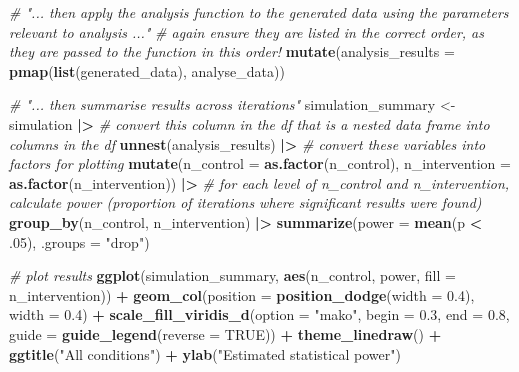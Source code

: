 \documentclass[
]{article}
\newenvironment{Shaded}{\begin{snugshade}}{\end{snugshade}}
\newcommand{\AttributeTok}[1]{\textcolor[rgb]{0.13,0.29,0.53}{#1}}
\newcommand{\CommentTok}[1]{\textcolor[rgb]{0.56,0.35,0.01}{\textit{#1}}}
\newcommand{\ConstantTok}[1]{\textcolor[rgb]{0.56,0.35,0.01}{#1}}
\newcommand{\DecValTok}[1]{\textcolor[rgb]{0.00,0.00,0.81}{#1}}
\newcommand{\FloatTok}[1]{\textcolor[rgb]{0.00,0.00,0.81}{#1}}
\newcommand{\FunctionTok}[1]{\textcolor[rgb]{0.13,0.29,0.53}{\textbf{#1}}}
\newcommand{\NormalTok}[1]{#1}
\newcommand{\OtherTok}[1]{\textcolor[rgb]{0.56,0.35,0.01}{#1}}
\newcommand{\SpecialCharTok}[1]{\textcolor[rgb]{0.81,0.36,0.00}{\textbf{#1}}}
\newcommand{\StringTok}[1]{\textcolor[rgb]{0.31,0.60,0.02}{#1}}
\begin{document}
\begin{Shaded}
\begin{Highlighting}[]
  \CommentTok{\# "... then apply the analysis function to the generated data using the parameters relevant to analysis ..."}
  \CommentTok{\# again ensure they are listed in the correct order, as they are passed to the function in this order!}
  \FunctionTok{mutate}\NormalTok{(}\AttributeTok{analysis\_results =} \FunctionTok{pmap}\NormalTok{(}\FunctionTok{list}\NormalTok{(generated\_data),}
\NormalTok{                                 analyse\_data))}
  

\CommentTok{\# "... then summarise results across iterations"}
\NormalTok{simulation\_summary }\OtherTok{\textless{}{-}}\NormalTok{ simulation }\SpecialCharTok{|\textgreater{}}
  \CommentTok{\# convert this column in the df that is a nested data frame into columns in the df}
  \FunctionTok{unnest}\NormalTok{(analysis\_results) }\SpecialCharTok{|\textgreater{}} 
  \CommentTok{\# convert these variables into factors for plotting}
  \FunctionTok{mutate}\NormalTok{(}\AttributeTok{n\_control =} \FunctionTok{as.factor}\NormalTok{(n\_control), }
         \AttributeTok{n\_intervention =} \FunctionTok{as.factor}\NormalTok{(n\_intervention)) }\SpecialCharTok{|\textgreater{}}
  \CommentTok{\# for each level of n\_control and n\_intervention, calculate power (proportion of iterations where significant results were found)}
  \FunctionTok{group\_by}\NormalTok{(n\_control, }
\NormalTok{           n\_intervention) }\SpecialCharTok{|\textgreater{}}
  \FunctionTok{summarize}\NormalTok{(}\AttributeTok{power =} \FunctionTok{mean}\NormalTok{(p }\SpecialCharTok{\textless{}}\NormalTok{ .}\DecValTok{05}\NormalTok{), }\AttributeTok{.groups =} \StringTok{"drop"}\NormalTok{)}

\CommentTok{\# plot results}
\FunctionTok{ggplot}\NormalTok{(simulation\_summary, }\FunctionTok{aes}\NormalTok{(n\_control, power, }\AttributeTok{fill =}\NormalTok{ n\_intervention)) }\SpecialCharTok{+}
  \FunctionTok{geom\_col}\NormalTok{(}\AttributeTok{position =} \FunctionTok{position\_dodge}\NormalTok{(}\AttributeTok{width =} \FloatTok{0.4}\NormalTok{), }\AttributeTok{width =} \FloatTok{0.4}\NormalTok{) }\SpecialCharTok{+}
  \FunctionTok{scale\_fill\_viridis\_d}\NormalTok{(}\AttributeTok{option =} \StringTok{"mako"}\NormalTok{, }\AttributeTok{begin =} \FloatTok{0.3}\NormalTok{, }\AttributeTok{end =} \FloatTok{0.8}\NormalTok{, }
                       \AttributeTok{guide =} \FunctionTok{guide\_legend}\NormalTok{(}\AttributeTok{reverse =} \ConstantTok{TRUE}\NormalTok{)) }\SpecialCharTok{+}
  \FunctionTok{theme\_linedraw}\NormalTok{() }\SpecialCharTok{+}
  \FunctionTok{ggtitle}\NormalTok{(}\StringTok{"All conditions"}\NormalTok{) }\SpecialCharTok{+}
  \FunctionTok{ylab}\NormalTok{(}\StringTok{"Estimated statistical power"}\NormalTok{)}
\end{Highlighting}
\end{Shaded}
\end{document}
